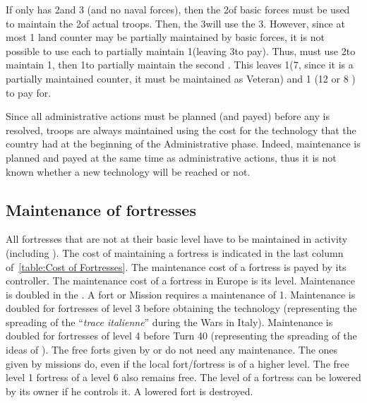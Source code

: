 \begin{exemple}
  \smallskip

  If \SPA only has 2\ARMY\Faceplus and 3 \ARMY\Facemoins (and no naval
  forces), then the 2\ARMY\Faceplus of basic forces must be used to maintain
  the 2\ARMY\Faceplus of actual troops. Then, the 3\ARMY\Facemoins will use
  the 3\GD. However, since at most 1 land counter may be partially maintained
  by basic forces, it is not possible to use each \GD to partially maintain
  1\ARMY\Facemoins (leaving 3\LD to pay). Thus, \SPA must use 2\GD to maintain
  1\ARMY\Facemoins, then 1\GD to partially maintain the second
  \ARMY\Facemoins. This leaves 1\LD (7\ducats, since it is a partially
  maintained counter, it must be maintained as Veteran) and 1\ARMY\Facemoins
  (12 or 8 \ducats) to pay for.
\end{exemple}

\begin{designnote}
  Since all administrative actions must be planned (and payed) before any is
  resolved, troops are always maintained using the cost for the technology
  that the country had at the beginning of the Administrative phase. Indeed,
  maintenance is planned and payed at the same time as administrative actions,
  thus it is not known whether a new technology will be reached or not.
\end{designnote}



\subsection{Maintenance of fortresses}

\aparag All fortresses that are not at their basic level have to be maintained
in activity (including \Presidios). The cost of maintaining a fortress is
indicated in the last column of~\ref{table:Cost of Fortresses}.
\bparag The maintenance cost of a fortress is payed by its controller.
\bparag The maintenance cost of a fortress in Europe is its level.
\bparag Maintenance is doubled in the \ROTW. A fort or Mission requires a
maintenance of 1\ducats.
\bparag Maintenance is doubled for fortresses of level 3 before obtaining the
technology \TARQ (representing the spreading of the ``\emph{trace italienne}''
during the Wars in Italy).
\bparag Maintenance is doubled for fortresses of level 4 before Turn 40
(representing the spreading of the ideas of ).
\bparag The free forts given by \TP or \COL do not need any maintenance. The
ones given by missions do, even if the local fort/fortress is of a higher
level. The free level 1 fortress of a level 6 \COL also remains free.
\bparag The level of a fortress can be lowered by its owner if he controls
it. A lowered fort is destroyed.

